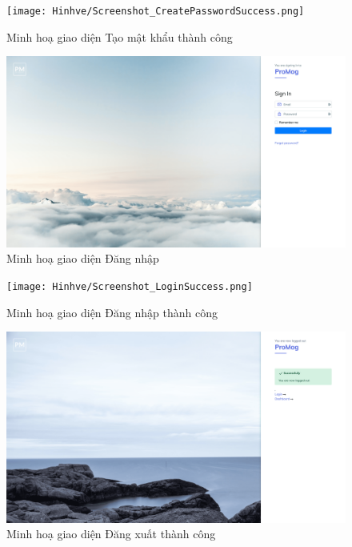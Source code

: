 \documentclass[../DoAn.tex]{subfiles}
\begin{document}
\begin{figure}[H]
    \centering
    \texttt{[image: Hinhve/Screenshot\_CreatePasswordSuccess.png]}
    \caption{Minh hoạ giao diện Tạo mật khẩu thành công}
    \label{fig:Screenshot_CreatePasswordSuccess}
\end{figure}

\newpage

\begin{figure}[H]
    \centering
    \includegraphics[width=1.0\linewidth]{Hinhve/Screenshot_Login.png}
    \caption{Minh hoạ giao diện Đăng nhập}
    \label{fig:Screenshot_Login}
\end{figure}


\begin{figure}[H]
    \centering
    \texttt{[image: Hinhve/Screenshot\_LoginSuccess.png]}
    \caption{Minh hoạ giao diện Đăng nhập thành công}
    \label{fig:Screenshot_LoginSuccess}
\end{figure}

\newpage

\begin{figure}[H]
    \centering
    \includegraphics[width=1.0\linewidth]{Hinhve/Screenshot_LogoutSuccess.png}
    \caption{Minh hoạ giao diện Đăng xuất thành công}
    \label{fig:Screenshot_LogoutSuccess}
\end{figure}
\end{document}
